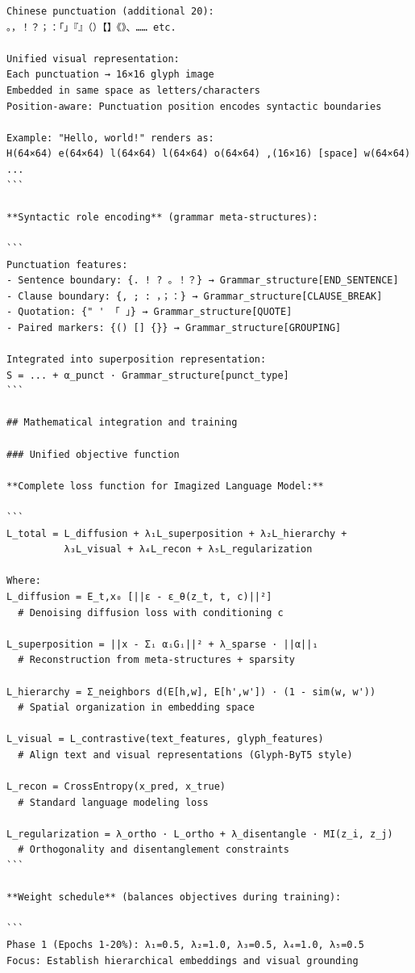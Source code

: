 \documentclass[11pt]{article}
\begin{document}
\begin{verbatim}
Chinese punctuation (additional 20):
。，！？；：「」『』（）【】《》、…… etc.

Unified visual representation:
Each punctuation → 16×16 glyph image
Embedded in same space as letters/characters
Position-aware: Punctuation position encodes syntactic boundaries

Example: "Hello, world!" renders as:
H(64×64) e(64×64) l(64×64) l(64×64) o(64×64) ,(16×16) [space] w(64×64) ...
```

**Syntactic role encoding** (grammar meta-structures):

```
Punctuation features:
- Sentence boundary: {. ! ? 。！？} → Grammar_structure[END_SENTENCE]
- Clause boundary: {, ; : ，；：} → Grammar_structure[CLAUSE_BREAK]
- Quotation: {" ' 「 」} → Grammar_structure[QUOTE]
- Paired markers: {() [] {}} → Grammar_structure[GROUPING]

Integrated into superposition representation:
S = ... + α_punct · Grammar_structure[punct_type]
```

## Mathematical integration and training

### Unified objective function

**Complete loss function for Imagized Language Model:**

```
L_total = L_diffusion + λ₁L_superposition + λ₂L_hierarchy + 
          λ₃L_visual + λ₄L_recon + λ₅L_regularization

Where:
L_diffusion = E_t,x₀ [||ε - ε_θ(z_t, t, c)||²]  
  # Denoising diffusion loss with conditioning c

L_superposition = ||x - Σᵢ αᵢGᵢ||² + λ_sparse · ||α||₁
  # Reconstruction from meta-structures + sparsity

L_hierarchy = Σ_neighbors d(E[h,w], E[h',w']) · (1 - sim(w, w'))
  # Spatial organization in embedding space

L_visual = L_contrastive(text_features, glyph_features)
  # Align text and visual representations (Glyph-ByT5 style)

L_recon = CrossEntropy(x_pred, x_true)
  # Standard language modeling loss

L_regularization = λ_ortho · L_ortho + λ_disentangle · MI(z_i, z_j)
  # Orthogonality and disentanglement constraints
```

**Weight schedule** (balances objectives during training):

```
Phase 1 (Epochs 1-20%): λ₁=0.5, λ₂=1.0, λ₃=0.5, λ₄=1.0, λ₅=0.5
Focus: Establish hierarchical embeddings and visual grounding


\end{verbatim}
\end{document}
